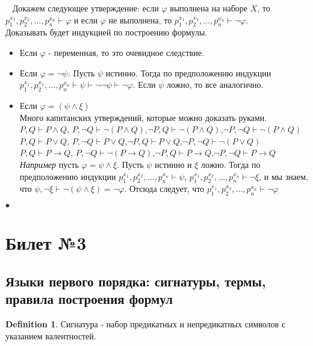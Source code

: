 \documentclass[a4paper]{article}
\theoremstyle{plain}
\theoremstyle{remark}
\theoremstyle{definition}
\newtheorem{definition}{Definition}
\renewenvironment{proof}{{\bfseries Proof}}{$\bullet$}
\newcommand{\forcenewline}{\ \newline}
\begin{document}
\begin{proof}
	\forcenewline
	Докажем следующее утверждение: если $\varphi$ выполнена на наборе $X$, то $p_1^{x_1}, p_2^{x_2}, \ldots, p_n^{x_n} \vdash \varphi$ и если $\varphi$ не выполнена, то $p_1^{x_1}, p_2^{x_2}, \ldots, p_n^{x_n} \vdash \lnot \varphi$. \\
	Доказывать будет индукцией по построению формулы. 
\begin{itemize}
\item Если $\varphi$ - переменная, то это очевидное следствие.
\item Если $\varphi = \lnot \psi$. Пусть $\psi$ истинно. Тогда по предположению индукции $p_1^{x_1}, p_2^{x_2}, \ldots, p_n^{x_n} \vdash \psi \vdash \lnot \lnot \psi \vdash \lnot \varphi$. Если $\psi$ ложно, то все аналогично.	
\item Если $\varphi = (\psi \land \xi)$ \\
	Много капитанских утверждений, которые можно доказать руками.
	$P,Q \vdash P \land Q$, $P,\lnot Q \vdash \lnot(P \land Q)$,$\lnot P,Q \vdash \lnot(P \land Q)$,$\lnot P,\lnot Q \vdash \lnot(P \land Q)$ \\
	$P,Q \vdash P \lor Q$, $P,\lnot Q \vdash P \lor Q$,$\lnot P,Q \vdash P \lor Q$,$\lnot P,\lnot Q \vdash \lnot(P \lor Q)$ \\
	$P,Q \vdash P \rightarrow Q$, $P,\lnot Q \vdash \lnot(P \rightarrow Q)$,$\lnot P,Q \vdash P \rightarrow Q$,$\lnot P,\lnot Q \vdash P \rightarrow Q$ \\
	\emph{Например} пусть $\varphi = \psi \land \xi$. Пусть $\psi$ истинно и $\xi$ ложно. Тогда по предположению индукции $p_1^{x_1}, p_2^{x_2}, \ldots, p_n^{x_n} \vdash \psi$, $p_1^{x_1}, p_2^{x_2}, \ldots, p_n^{x_n} \vdash \lnot \xi$, и мы знаем, что $\psi,\lnot \xi \vdash \lnot(\psi \land \xi) = \lnot \varphi$. Отсюда следует, что $p_1^{x_1}, p_2^{x_2}, \ldots, p_n^{x_n} \vdash \lnot \varphi$
\end{itemize}
\end{proof}
\section{Билет №3}
\subsection{Языки первого порядка: сигнатуры, термы, правила построения формул}
\begin{definition}
	Сигнатура - набор предикатных и непредикатных символов с указанием валентностей. 
\end{definition}
\end{document}
